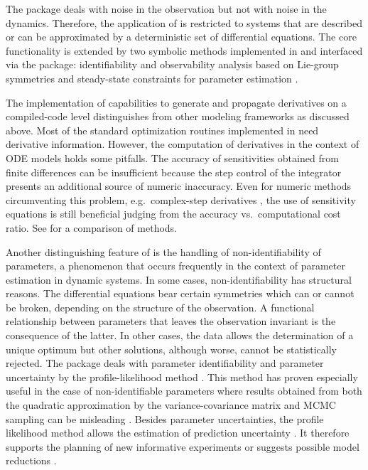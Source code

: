 \documentclass[article]{jss}
\begin{document}
The  package deals with noise in the observation but not with noise in the dynamics. Therefore, the application of  is restricted to systems that are described or can be approximated by a deterministic set of differential equations. 
The core functionality is extended by two symbolic methods implemented in  and interfaced via the  package: identifiability and observability analysis based on Lie-group symmetries \citep{merkt2015higher} and steady-state constraints for parameter estimation \citep{rosenblatt2016customized}.

The implementation of capabilities to generate and propagate derivatives on a compiled-code level distinguishes  from other modeling frameworks as discussed above. Most of the standard optimization routines implemented in  need derivative information. However, the computation of derivatives in the context of ODE models holds some pitfalls. The accuracy of sensitivities obtained from finite differences can be insufficient because the step control of the integrator presents an additional source of numeric inaccuracy. Even for numeric methods circumventing this problem, e.g.~complex-step derivatives \citep{squire1998using}, the use of sensitivity equations is still beneficial judging from the accuracy vs.~computational cost ratio. See \cite{raue2013lessons} for a comparison of methods.

Another distinguishing feature of  is the handling of non-identifiability of parameters, a phenomenon that occurs frequently in the context of parameter estimation in dynamic systems.
In some cases, non-identifiability has structural reasons. The differential equations bear certain symmetries which can or cannot be broken, depending on the structure of the observation. A functional relationship between parameters that leaves the observation invariant is the consequence of the latter. In other cases, the data allows the determination of a unique optimum but other solutions, although worse, cannot be statistically rejected. The  package deals with parameter identifiability and parameter uncertainty by the profile-likelihood method \citep{murphy2000profile, raue2009structural, kreutz2013profile}. This method has proven especially useful in the case of non-identifiable parameters where results obtained from both the quadratic approximation by the variance-covariance matrix and MCMC sampling can be misleading \citep{raue2013joining}. Besides parameter uncertainties, the profile likelihood method allows the estimation of prediction uncertainty \citep{kreutz2012likelihood}. It therefore supports the planning of new informative experiments \citep{raue2011addressing} or suggests possible model reductions \citep{maiwald2016driving}.
\end{document}
